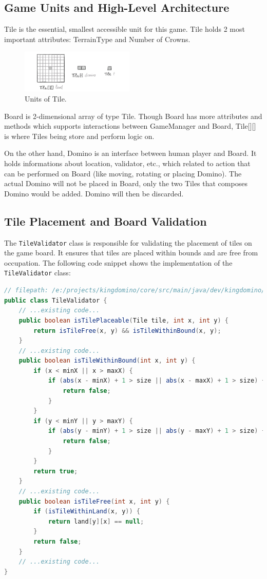 \documentclass[conference]{IEEEtran}
\begin{document}
\subsection{Game Units and High-Level Architecture}

Tile is the essential, smallest accessible unit for this game. Tile holds 2
most important attributes: TerrainType and Number of Crowns.

\begin{figure}[htbp]
    \centerline{\includegraphics[width=0.48\textwidth]{assets/unit.png}}
    \caption{Units of Tile.}\label{fig:unit}
\end{figure}

Board is 2-dimensional array of type Tile. Though Board has more attributes and
methods which supports interactions between GameManager and Board, Tile[][] is
where Tiles being store and perform logic on.

On the other hand, Domino is an interface between human player and Board. It
holds informations about location, validator, etc., which related to action
that can be performed on Board (like moving, rotating or placing Domino). The
actual Domino will not be placed in Board, only the two Tiles that composes
Domino would be added. Domino will then be discarded.

\subsection{Tile Placement and Board Validation}

The \texttt{TileValidator} class is responsible for validating the placement of tiles on the game board. It ensures that tiles are placed within bounds and are free from occupation. The following code snippet shows the implementation of the \texttt{TileValidator} class:

\begin{lstlisting}[language=Java]
// filepath: /e:/projects/kingdomino/core/src/main/java/dev/kingdomino/game/TileValidator.java
public class TileValidator {
    // ...existing code...
    public boolean isTilePlaceable(Tile tile, int x, int y) {
        return isTileFree(x, y) && isTileWithinBound(x, y);
    }
    // ...existing code...
    public boolean isTileWithinBound(int x, int y) {
        if (x < minX || x > maxX) {
            if (abs(x - minX) + 1 > size || abs(x - maxX) + 1 > size) {
                return false;
            }
        }
        if (y < minY || y > maxY) {
            if (abs(y - minY) + 1 > size || abs(y - maxY) + 1 > size) {
                return false;
            }
        }
        return true;
    }
    // ...existing code...
    public boolean isTileFree(int x, int y) {
        if (isTileWithinLand(x, y)) {
            return land[y][x] == null;
        }
        return false;
    }
    // ...existing code...
}
\end{lstlisting}
\end{document}
